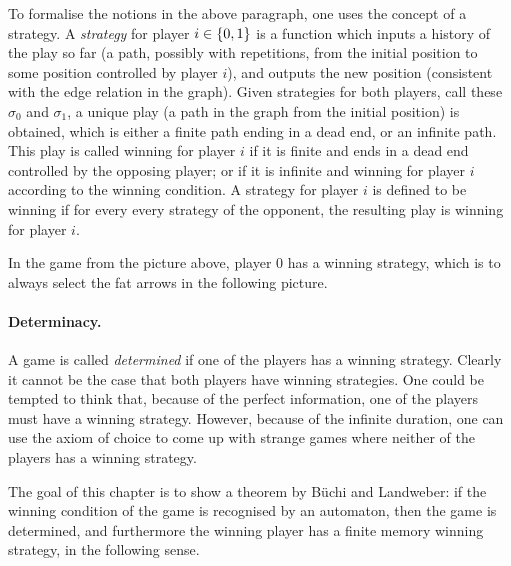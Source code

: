 To formalise the notions in the above paragraph, one uses the concept of a strategy. A \emph{strategy} for player $i \in \{0,1\}$ is a function which inputs a history of the play so far (a path, possibly with repetitions,  from the initial position to some position controlled by player $i$), and outputs the new position (consistent with the edge relation in the graph). Given strategies for both players, call these $\sigma_0$ and $\sigma_1$, a unique play (a path in the graph from the initial position) is obtained, which is either a finite path ending in a dead end, or an infinite path. This play is called winning for player $i$ if it is finite and ends in a dead end controlled by the opposing player; or if it is infinite and winning for player $i$ according to the winning condition. A  strategy for player $i$ is defined to be winning if  for every every  strategy  of the opponent, the resulting play is winning for player $i$.

\begin{example}\label{ex:winning-strategy}
In the game from the picture above, player $0$ has a winning strategy, which is to always select the fat arrows in the following picture.
	\end{example}



\paragraph*{Determinacy.} A game is called \emph{determined} if one of the players has a winning strategy. Clearly it cannot be the case that both players have winning strategies. One could be tempted to think that, because of the perfect information, one of the players must have a winning strategy. However, because of the infinite duration, one can use the axiom of choice to come up with strange games where neither of the players has a winning strategy.

The goal of this chapter is to show a theorem by Büchi and Landweber: if the winning condition of the game is recognised by an automaton, then the game is determined, and furthermore the winning player has a finite memory winning strategy, in the following sense.

